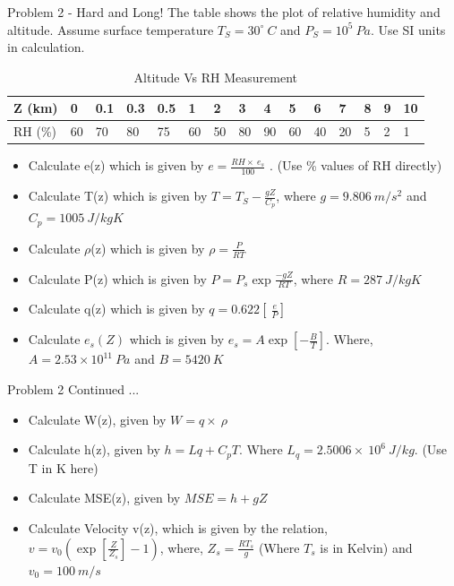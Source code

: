 \documentclass[10pt]{beamer}
\begin{document}
\begin{frame}{Problem 2 - Hard and Long!}
The table shows the plot of relative humidity and altitude. Assume surface temperature $T_S = 30^\circ\ C$ and $P_S = 10^5\ Pa$. Use SI units in calculation.
\begin{table}
\centering
\caption{Altitude Vs RH Measurement}
\label{ZvsRH}
\begin{tabular}{|l|l|l|l|l|l|l|l|l|l|l|l|l|l|l|}
\hline
Z (km)  & 0  & 0.1 & 0.3 & 0.5 & 1  & 2  & 3  & 4   & 5  & 6  & 7  & 8 & 9 & 10 \\ \hline
RH (\%) & 60 & 70  & 80  & 75  & 60 & 50 & 80 & 90 & 60 & 40 & 20 & 5 & 2 & 1  \\ \hline
\end{tabular}
\end{table}
\begin{itemize}
	\item Calculate e(z) which is given by $e = \frac{RH\times\ e_s}{100}$ . (Use \% values of RH directly)
	\item Calculate T(z) which is given by $T = T_S - \frac{gZ}{C_p}$, where $g = 9.806\ m/s^2$ and $C_p = 1005\ J/kgK$
	\item Calculate $\rho$(z) which is given by $\rho = \frac{P}{RT}$
	\item Calculate P(z) which is given by $P = P_s\exp{\frac{-gZ}{RT}}$, where $R = 287\ J/kgK$
	\item Calculate q(z) which is given by $q = 0.622\left[\ \frac{e}{P} \right]$
	\item Calculate $e_s(Z)$ which is given by $e_s = A\exp{\left[-\frac{B}{T}\right]}$. Where, $A = 2.53\times10^{11}\ Pa$ and $B = 5420\ K$
\end{itemize}
\end{frame}

\begin{frame}{Problem 2 Continued ...}
	\begin{itemize}
		\item Calculate W(z), given by $W = q\times\ \rho$
		\item Calculate h(z), given by $h = Lq + C_pT$. Where $L_q = 2.5006\times\ 10^6\ J/kg$. (Use T in K here)
		\item Calculate MSE(z), given by $MSE = h + gZ$
		\item Calculate Velocity v(z), which is given by the relation, $v = v_0\left(\exp\left[\frac{Z}{Z_s}\right] - 1\right)$, where, $Z_s = \frac{RT_s}{g}$ (Where $T_s$ is in Kelvin) and $v_0 = 100\ m/s$
	\end{itemize}
\end{frame}
\end{document}
